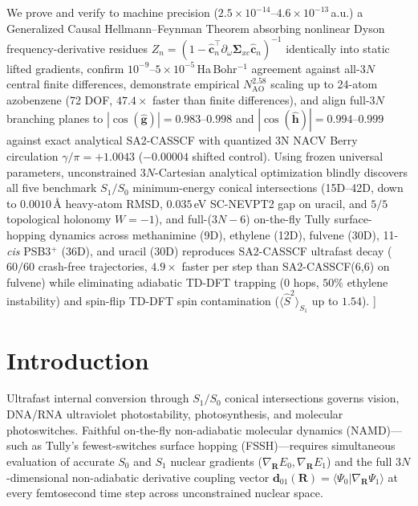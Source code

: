 \documentclass[10pt,twocolumn]{article}
\theoremstyle{natthm}
\newcommand{\Sig}{\mathbf{\Sigma}_{xc}}
\newcommand{\Ssq}{\langle\hat{S}^2\rangle}
\begin{document}
{{{{      We prove and verify to machine precision ($2.5\times 10^{-14}$--$4.6\times 10^{-13}$\,a.u.) a Generalized Causal Hellmann--Feynman Theorem absorbing nonlinear Dyson frequency-derivative residues $Z_n=(1-\hat{\mathbf{c}}_n^\top\partial_\omega\Sig\hat{\mathbf{c}}_n)^{-1}$ identically into static lifted gradients, confirm $10^{-9}$--$5\times 10^{-5}$\,Ha\,Bohr$^{-1}$ agreement against all-$3N$ central finite differences, demonstrate empirical $N_{\mathrm{AO}}^{2.58}$ scaling up to 24-atom azobenzene (72 DOF, $47.4\times$ faster than finite differences), and align full-$3N$ branching planes to $|\cos(\hat{\mathbf{g}})|=0.983$--$0.998$ and $|\cos(\hat{\mathbf{h}})|=0.994$--$0.999$ against exact analytical SA2-CASSCF with quantized 3N NACV Berry circulation $\gamma/\pi=+1.0043$ ($-0.00004$ shifted control).
      Using frozen universal parameters, unconstrained $3N$-Cartesian analytical optimization blindly discovers all five benchmark $S_1/S_0$ minimum-energy conical intersections (15D--42D, down to $0.0010$\,\AA{} heavy-atom RMSD, $0.035$\,eV SC-NEVPT2 gap on uracil, and $5/5$ topological holonomy $W=-1$), and full-($3N{-}6$) on-the-fly Tully surface-hopping dynamics across methanimine (9D), ethylene (12D), fulvene (30D), 11-\emph{cis} PSB3$^+$ (36D), and uracil (30D) reproduces SA2-CASSCF ultrafast decay ($60/60$ crash-free trajectories, $4.9\times$ faster per step than SA2-CASSCF(6,6) on fulvene) while eliminating adiabatic TD-DFT trapping ($0$ hops, $50\%$ ethylene instability) and spin-flip TD-DFT spin contamination ($\Ssq_{S_1}$ up to $1.54$).%
      }\vspace{3pt}%
    }%
  }
  \vspace{11pt}
}]

\section*{Introduction}
Ultrafast internal conversion through $S_1/S_0$ conical intersections governs vision, DNA/RNA ultraviolet photostability, photosynthesis, and molecular photoswitches\cite{yarkony1996,domcke2004,curchod2018namd}.
Faithful on-the-fly non-adiabatic molecular dynamics (NAMD)---such as Tully's fewest-switches surface hopping (FSSH)\cite{tully1990fssh,granucci2007edc,subotnik2016fssh}---requires simultaneous evaluation of accurate $S_0$ and $S_1$ nuclear gradients ($\nabla_{\mathbf{R}}E_0, \nabla_{\mathbf{R}}E_1$) and the full $3N$-dimensional non-adiabatic derivative coupling vector $\mathbf{d}_{01}(\mathbf{R})=\langle\Psi_0|\nabla_{\mathbf{R}}\Psi_1\rangle$ at every femtosecond time step across unconstrained nuclear space\cite{send2010nacv,curchod2018namd}.
\end{document}
